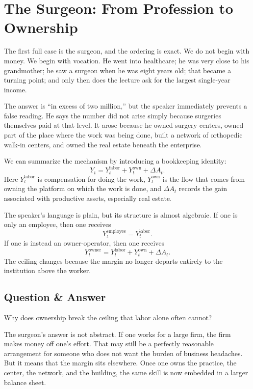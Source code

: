 \section{The Surgeon: From Profession to Ownership}

The first full case is the surgeon, and the ordering is exact. We do not begin with money. We begin with vocation. He went into healthcare; he was very close to his grandmother; he saw a surgeon when he was eight years old; that became a turning point; and only then does the lecture ask for the largest single-year income.

The answer is ``in excess of two million,'' but the speaker immediately prevents a false reading. He says the number did not arise simply because surgeries themselves paid at that level. It arose because he owned surgery centers, owned part of the place where the work was being done, built a network of orthopedic walk-in centers, and owned the real estate beneath the enterprise.

We can summarize the mechanism by introducing a bookkeeping identity:
\begin{equation}
Y_t = Y_t^{\text{labor}} + Y_t^{\text{own}} + \Delta A_t.
\end{equation}
Here \(Y_t^{\text{labor}}\) is compensation for doing the work, \(Y_t^{\text{own}}\) is the flow that comes from owning the platform on which the work is done, and \(\Delta A_t\) records the gain associated with productive assets, especially real estate.

The speaker's language is plain, but its structure is almost algebraic. If one is only an employee, then one receives
\begin{equation}
Y_t^{\text{employee}} = Y_t^{\text{labor}}.
\end{equation}
If one is instead an owner-operator, then one receives
\begin{equation}
Y_t^{\text{owner}} = Y_t^{\text{labor}} + Y_t^{\text{own}} + \Delta A_t.
\end{equation}
The ceiling changes because the margin no longer departs entirely to the institution above the worker.

\subsection{Question \& Answer}

Why does ownership break the ceiling that labor alone often cannot?

The surgeon's answer is not abstract. If one works for a large firm, the firm makes money off one's effort. That may still be a perfectly reasonable arrangement for someone who does not want the burden of business headaches. But it means that the margin sits elsewhere. Once one owns the practice, the center, the network, and the building, the same skill is now embedded in a larger balance sheet.

